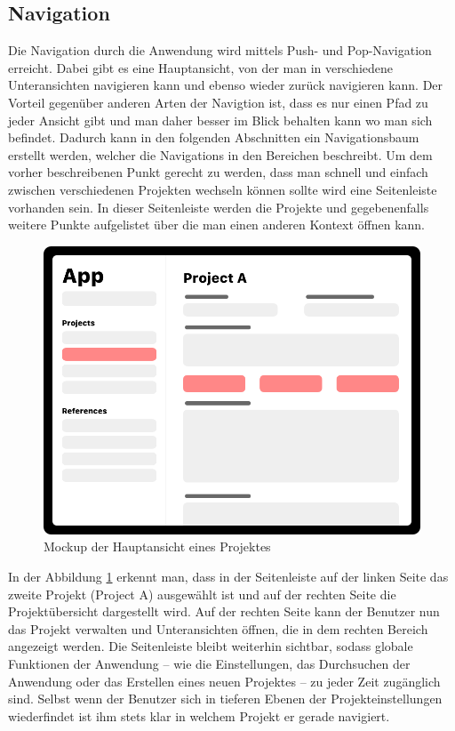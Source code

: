 \subsection{Navigation}
Die Navigation durch die Anwendung wird mittels Push- und Pop-Navigation erreicht.
Dabei gibt es eine Hauptansicht, von der man in verschiedene Unteransichten navigieren kann und ebenso wieder zurück navigieren kann.
Der Vorteil gegenüber anderen Arten der Navigtion ist, dass es nur einen Pfad zu jeder Ansicht gibt und man daher besser im Blick behalten kann wo man sich befindet.
Dadurch kann in den folgenden Abschnitten ein Navigationsbaum erstellt werden, welcher die Navigations in den Bereichen beschreibt.\pbreak%
%
Um dem vorher beschreibenen Punkt gerecht zu werden, dass man schnell und einfach zwischen verschiedenen Projekten wechseln können sollte wird eine Seitenleiste vorhanden sein.
In dieser Seitenleiste werden die Projekte und gegebenenfalls weitere Punkte aufgelistet über die man einen anderen Kontext öffnen kann.
\begin{figure}[h!]
	\centering
	\vspace{15pt}
	\includegraphics[scale=0.4]{images/design-app}
	\caption{Mockup der Hauptansicht eines Projektes}
	\label{fig:design-app}
\end{figure}
In der Abbildung \ref{fig:design-app} erkennt man, dass in der Seitenleiste auf der linken Seite das zweite Projekt (Project A) ausgewählt ist und auf der rechten Seite die Projektübersicht dargestellt wird.
Auf der rechten Seite kann der Benutzer nun das Projekt verwalten und Unteransichten öffnen, die in dem rechten Bereich angezeigt werden.
Die Seitenleiste bleibt weiterhin sichtbar, sodass globale Funktionen der Anwendung – wie die Einstellungen, das Durchsuchen der Anwendung oder das Erstellen eines neuen Projektes – zu jeder Zeit zugänglich sind.
Selbst wenn der Benutzer sich in tieferen Ebenen der Projekteinstellungen wiederfindet ist ihm stets klar in welchem Projekt er gerade navigiert.

